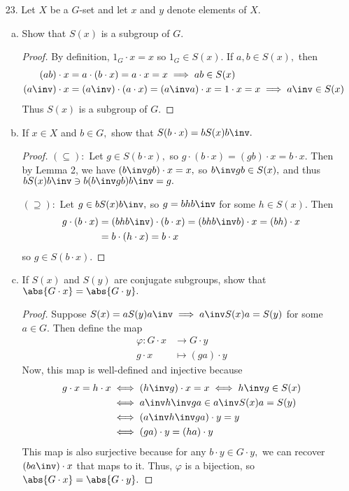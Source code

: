 \documentclass{article}
\begin{document}
\begin{itemize}
	\item[23.] Let $X$ be a $G$-set and let $x$ and $y$ denote elements of $X.$ 
		\begin{enumerate}[(a)]
			\item Show that $S(x)$ is a subgroup of $G.$
				\begin{proof}
					By definition, $1_G\cdot x=x$ so $1_G\in S(x).$ If $a, b\in S(x),$ then
					\begin{align*}
						(ab)\cdot x &= a\cdot (b\cdot x) = a\cdot x = x \implies ab\in S(x) \\
						(a\inv)\cdot x &= (a\inv)\cdot (a\cdot x) = (a\inv a)\cdot x = 1\cdot x = x\implies a\inv\in S(x)
					\end{align*}
					Thus $S(x)$ is a subgroup of $G.$
				\end{proof}

			\item If $x\in X$ and $b\in G,$ show that $S(b\cdot x)=b S(x)b\inv.$
				\begin{proof}
					$(\subseteq):$ Let $g\in S(b\cdot x),$ so $g\cdot (b\cdot x) = (gb)\cdot x = b\cdot x.$ Then by Lemma 2, we have $(b\inv gb)\cdot x = x,$ so $b\inv gb\in S(x),$ and thus $bS(x)b\inv \ni b(b\inv gb)b\inv = g.$

					$(\supseteq):$ Let $g\in bS(x)b\inv,$ so $g=bhb\inv$ for some $h\in S(x).$ Then
					\begin{align*}
						g\cdot (b\cdot x) &= (bhb\inv)\cdot(b\cdot x) = (bhb\inv b)\cdot x = (bh)\cdot x \\
						&= b\cdot (h\cdot x) = b\cdot x
					\end{align*}
					so $g\in S(b\cdot x).$
				\end{proof}

			\item If $S(x)$ and $S(y)$ are conjugate subgroups, show that $\abs{G\cdot x}=\abs{G\cdot y}.$
				\begin{proof}
					Suppose $S(x)=aS(y)a\inv\implies a\inv S(x)a=S(y)$ for some $a\in G.$ Then define the map
					\begin{align*}
						\varphi: G\cdot x &\to G\cdot y \\
						g\cdot x &\mapsto (ga)\cdot y
					\end{align*}
					Now, this map is well-defined and injective because
					\begin{align*}
						g\cdot x = h\cdot x &\iff (h\inv g)\cdot x = x \iff h\inv g \in S(x) \\
						&\iff a\inv h\inv ga \in a\inv S(x)a = S(y) \\
						&\iff (a\inv h\inv ga)\cdot y = y \\
						&\iff (ga)\cdot y = (ha)\cdot y
					\end{align*}
					This map is also surjective because for any $b\cdot y\in G\cdot y,$ we can recover $(ba\inv)\cdot x$ that maps to it. Thus, $\varphi$ is a bijection, so $\abs{G\cdot x}=\abs{G\cdot y}.$
				\end{proof}
				

\end{enumerate}
\end{itemize}
\end{document}
